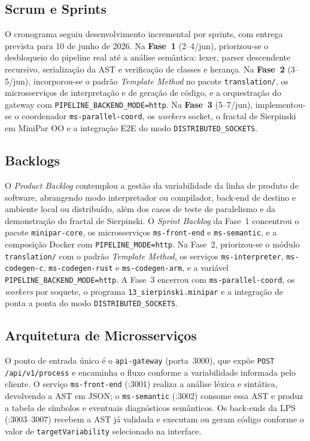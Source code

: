 \documentclass[12pt]{article}
\begin{document}
\subsection{Scrum e Sprints}
O cronograma seguiu desenvolvimento incremental por sprints, com entrega prevista para 10 de junho de 2026. Na \textbf{Fase~1} (2--4/jun), priorizou-se o desbloqueio do pipeline real até a análise semântica: lexer, parser descendente recursivo, serialização da AST e verificação de classes e herança. Na \textbf{Fase~2} (3--5/jun), incorporou-se o padrão \emph{Template Method} no pacote \texttt{translation/}, os microsserviços de interpretação e de geração de código, e a orquestração do gateway com \texttt{PIPELINE\_BACKEND\_MODE=http}. Na \textbf{Fase~3} (5--7/jun), implementou-se o coordenador \texttt{ms-parallel-coord}, os \emph{workers} socket, o fractal de Sierpinski em MiniPar OO e a integração E2E do modo \texttt{DISTRIBUTED\_SOCKETS}.

\subsection{Backlogs}
O \emph{Product Backlog} contemplou a gestão da variabilidade da linha de produto de software, abrangendo modo interpretador ou compilador, back-end de destino e ambiente local ou distribuído, além dos casos de teste de paralelismo e da demonstração do fractal de Sierpinski. O \emph{Sprint Backlog} da Fase~1 concentrou o pacote \texttt{minipar-core}, os microsserviços \texttt{ms-front-end} e \texttt{ms-semantic}, e a composição Docker com \texttt{PIPELINE\_MODE=http}. Na Fase~2, priorizou-se o módulo \texttt{translation/} com o padrão \emph{Template Method}, os serviços \texttt{ms-interpreter}, \texttt{ms-codegen-c}, \texttt{ms-codegen-rust} e \texttt{ms-codegen-arm}, e a variável \texttt{PIPELINE\_BACKEND\_MODE=http}. A Fase~3 encerrou com \texttt{ms-parallel-coord}, os \emph{workers} por soquete, o programa \texttt{13\_sierpinski.minipar} e a integração de ponta a ponta do modo \texttt{DISTRIBUTED\_SOCKETS}.
\subsection{Arquitetura de Microsserviços}
O ponto de entrada único é o \texttt{api-gateway} (porta~3000), que expõe \texttt{POST /api/v1/process} e encaminha o fluxo conforme a variabilidade informada pelo cliente. O serviço \texttt{ms-front-end} (:3001) realiza a análise léxica e sintática, devolvendo a AST em JSON; o \texttt{ms-semantic} (:3002) consome essa AST e produz a tabela de símbolos e eventuais diagnósticos semânticos. Os back-ends da LPS (:3003--3007) recebem a AST já validada e executam ou geram código conforme o valor de \texttt{targetVariability} selecionado na interface.
\end{document}
